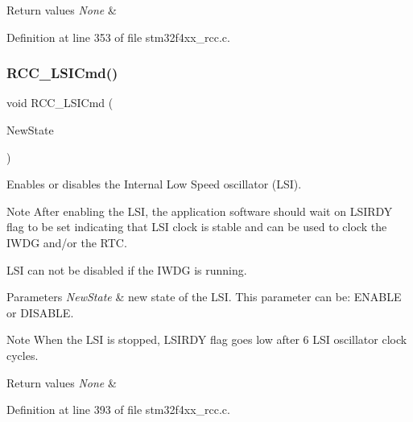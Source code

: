 \begin{DoxyRetVals}{Return values}
{\em None} & \\
\hline
\end{DoxyRetVals}


Definition at line 353 of file stm32f4xx\+\_\+rcc.\+c.

\mbox{\label{group___r_c_c_ga81e3ca29fd154ac2019bba6936d6d5ed}} 
\subsubsection{\texorpdfstring{R\+C\+C\+\_\+\+L\+S\+I\+Cmd()}{RCC\_LSICmd()}}
{\footnotesize\ttfamily void R\+C\+C\+\_\+\+L\+S\+I\+Cmd (\begin{DoxyParamCaption}\item[{Functional\+State}]{New\+State }\end{DoxyParamCaption})}



Enables or disables the Internal Low Speed oscillator (L\+SI). 

\begin{DoxyNote}{Note}
After enabling the L\+SI, the application software should wait on L\+S\+I\+R\+DY flag to be set indicating that L\+SI clock is stable and can be used to clock the I\+W\+DG and/or the R\+TC. 

L\+SI can not be disabled if the I\+W\+DG is running. 
\end{DoxyNote}

\begin{DoxyParams}{Parameters}
{\em New\+State} & new state of the L\+SI. This parameter can be\+: E\+N\+A\+B\+LE or D\+I\+S\+A\+B\+LE. \\
\hline
\end{DoxyParams}
\begin{DoxyNote}{Note}
When the L\+SI is stopped, L\+S\+I\+R\+DY flag goes low after 6 L\+SI oscillator clock cycles. 
\end{DoxyNote}

\begin{DoxyRetVals}{Return values}
{\em None} & \\
\hline
\end{DoxyRetVals}


Definition at line 393 of file stm32f4xx\+\_\+rcc.\+c.

